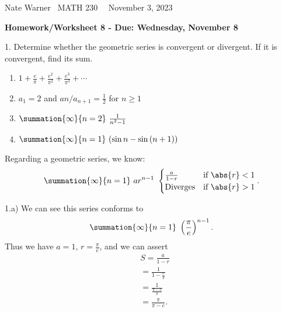 \documentclass{report}
\title{\Huge{}}
\author{\huge{Nathan Warner}}
\date{\huge{}}
\begin{document}
    \pagebreak \bigbreak \noindent
    Nate Warner \ \quad \quad \quad \quad \quad \quad \quad \quad \quad \quad \quad \quad \quad \quad \quad \quad \quad  MATH 230 \quad  \quad \quad \quad \quad \quad \quad \quad \quad \ \ \quad \quad November 3, 2023
    \begin{center}
        \textbf{Homework/Worksheet 8 - Due: Wednesday, November 8}
    \end{center}
    \bigbreak \noindent 
    \begin{mdframed}
        1. Determine whether the geometric series is convergent or divergent. If it is convergent, find its sum.
        \begin{enumerate}[label=(\alph*)]
            \item $1+\frac{e}{\pi} + \frac{e^{2}}{\pi^{2}} + \frac{e^{3}}{\pi^{3}} + \cdots$
            \item $a_{1} = 2$ and $an/a_{n+1} = \frac{1}{2}$ for $n \geq 1$
            \item $\summation{\infty}{n=2}\ \frac{1}{n^{2}-1}\  $
             \item $\summation{\infty}{n=1}\ (\sin{n} - \sin{(n+1)})\ $
        \end{enumerate}
    \end{mdframed}

    \bigbreak \noindent 
    \begin{remark}
        Regarding a geometric series, we know:
        \begin{align*}
            \summation{\infty}{n=1}\ ar^{n-1}\  
                    \begin{cases}
                         \frac{a}{1-r} & \text{if } \abs{r} < 1 \\
                         \text{Diverges} & \text{if }  \abs{r} > 1
                    \end{cases}
        .\end{align*}
    \end{remark}
    
    \bigbreak \noindent 
    1.a)
    We can see this series conforms to 
    \begin{align*}
       \summation{\infty}{n=1}\ \left(\frac{\pi}{e}\right)^{n-1}
    .\end{align*}
    \bigbreak \noindent 
    Thus we have $a=1$, $r=\frac{\pi}{e}$, and we can assert
    \begin{align*}
       &S = \frac{a}{1-r}  \\
       &=\frac{1}{1-\frac{e}{\pi}} \\
        &=\frac{1}{\frac{\pi-e}{\pi}} \\
        &=\frac{\pi}{\pi-e}
    .\end{align*}
\end{document}
